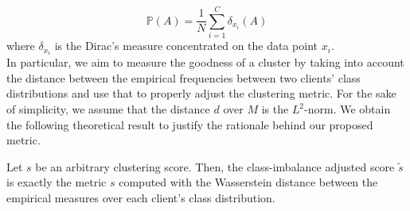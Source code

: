 \begin{equation}\label{eq:emp_measure}
    \mathbb{P}(A) = \dfrac{1}{N}\sum_{i = 1}^C\delta_{x_i}(A) 
\end{equation}
where $\delta_{x_i}$ is  the Dirac's measure concentrated on the data point $x_i$.\\
In particular, we aim to measure the goodness of a cluster by taking into account the distance between the empirical frequencies between two clients' class distributions and use that to properly adjust the clustering metric. For the sake of simplicity, we assume that the distance $d$ over $M$ is the $L^2$-norm. We obtain the following theoretical result to justify the rationale behind our proposed metric.
\begin{theorem}
    Let $s$ be an arbitrary clustering score. Then, the class-imbalance adjusted score $\tilde{s}$ is exactly the metric $s$ computed with the Wasserstein distance between the empirical measures over each client's class distribution.
\end{theorem}
